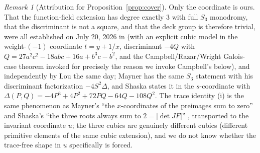 \documentclass[11pt]{amsart}
\theoremstyle{plain}
\theoremstyle{definition}
\theoremstyle{remark}
\newtheorem{remark}[theorem]{Remark}
\begin{document}
\begin{remark}[Attribution for Proposition~\ref{prop:cover}]
\label{rem:coverattrib}
Only the coordinate is ours. That the function-field extension has degree
exactly $3$ with full $S_{3}$ monodromy, that the discriminant is not a
square, and that the deck group is therefore trivial, were all established
on July 20, 2026 in \cite{MO513387} (with an explicit cubic model in the
weight-$(-1)$ coordinate $t=y+1/x$, discriminant $-4Q$ with
$Q=27a^{2}c^{2}-18abc+16a+b^{3}c-b^{2}$, and the Campbell/Razar/Wright
Galois-case theorem invoked for precisely the reason we invoke Campbell's
below), and independently by Lou \cite{Lou26} the same day; Mayner
\cite[\S4.4]{Mayner26} has the same $S_{3}$ statement with his
discriminant factorization $-4S^{2}\Delta$, and Shaska
\cite[Thm.~4.4(2)]{Shaska26} states it in the $s$-coordinate with
$\Delta(P,Q)=-4P^{3}+4P^{2}+72PQ-64Q-108Q^{2}$. The trace identity (i) is
the same phenomenon as Mayner's ``the $x$-coordinates of the preimages sum
to zero'' \cite[\S4.2]{Mayner26} and Shaska's ``the three roots always sum
to $2=|\det JF|$'' \cite[Rem.~5.4]{Shaska26}, transported to the invariant
coordinate $u$; the three cubics are genuinely different cubics (different
primitive elements of the same cubic extension), and we do not know
whether the trace-free shape in $u$ specifically is forced.
\end{remark}
\end{document}
